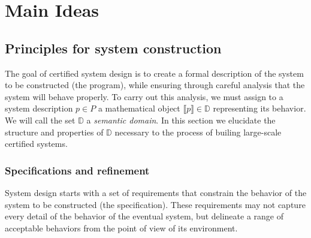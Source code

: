 \documentclass[sigplan,10pt,review,anonymous]{acmart}
\begin{document}
%



\section{Main Ideas} \label{sec:mainideas} %

\subsection{Principles for system construction} %


The goal of certified system design is
to create a formal description of
the system to be constructed (the program),
while ensuring through careful analysis that the system
will behave properly.
To carry out this analysis,
we must assign
to a system description $p \in P$
a mathematical object $\llbracket p \rrbracket \in \mathbb{D}$
representing its behavior.
We will call the set $\mathbb{D}$ a \emph{semantic domain}.
In this section we elucidate
the structure and properties of $\mathbb{D}$
necessary to the process of builing
large-scale certified systems.


\subsubsection{Specifications and refinement} %

System design starts with a set of requirements
that constrain the behavior of the system to be constructed
(the specification).
These requirements may not capture every detail
of the behavior of the eventual system,
but delineate a range of acceptable behaviors
from the point of view of its environment.
\end{document}
